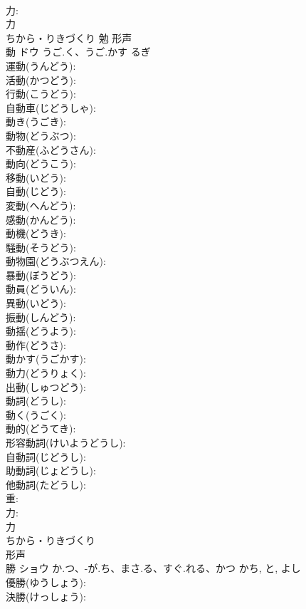 \documentclass[8pt]{extreport}
\begin{document}
\begin{CJK}{UTF8}{min}
\\	力: 
\\	力	
\\	ちから・りきづくり	勉	形声 
\\	動	ドウ	うご.く、うご.かす	るぎ	
\\	運動(うんどう): 
\\	活動(かつどう): 
\\	行動(こうどう): 
\\	自動車(じどうしゃ): 
\\	動き(うごき): 
\\	動物(どうぶつ): 
\\	不動産(ふどうさん): 
\\	動向(どうこう): 
\\	移動(いどう): 
\\	自動(じどう): 
\\	変動(へんどう): 
\\	感動(かんどう): 
\\	動機(どうき): 
\\	騒動(そうどう): 
\\	動物園(どうぶつえん): 
\\	暴動(ぼうどう): 
\\	動員(どういん): 
\\	異動(いどう): 
\\	振動(しんどう): 
\\	動揺(どうよう): 
\\	動作(どうさ): 
\\	動かす(うごかす): 
\\	動力(どうりょく): 
\\	出動(しゅつどう): 
\\	動詞(どうし): 
\\	動く(うごく): 
\\	動的(どうてき): 
\\	形容動詞(けいようどうし): 
\\	自動詞(じどうし): 
\\	助動詞(じょどうし): 
\\	他動詞(たどうし): 
\\	重: 
\\	力: 
\\	力	
\\	ちから・りきづくり	
\\	形声 
\\	勝	ショウ	か.つ、-が.ち、まさ.る、すぐ.れる、かつ	かち, と, よし	
\\	優勝(ゆうしょう): 
\\	決勝(けっしょう): 

\end{CJK}
\end{document}
